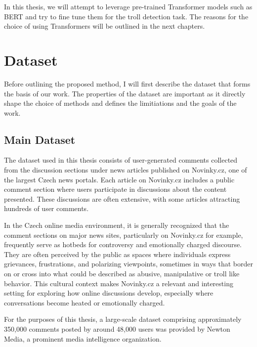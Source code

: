 \documentclass[twoside]{ctuthesis}
\theoremstyle{plain}
\theoremstyle{definition}
\theoremstyle{note}
\begin{document}
In this thesis, we will attempt to leverage pre-trained Transformer models such as BERT and try to fine tune them for the troll detection task. The reasons for the choice of using Transformers will be outlined in the next chapters.\par

\chapter{Dataset}

Before outlining the proposed method, I will first describe the dataset that forms the basis of our work. The properties of the dataset are important as it directly shape the choice of methods and defines the limitiations and the goals of the work. \par

\section{Main Dataset}
The dataset used in this thesis consists of user-generated comments collected from the discussion sections under news articles published on Novinky.cz, one of the largest Czech news portals. Each article on Novinky.cz includes a public comment section where users participate in discussions about the content presented. These discussions are often extensive, with some articles attracting hundreds of user comments.\par

In the Czech online media environment, it is generally recognized that the comment sections on major news sites, particularly on Novinky.cz for example, frequently serve as hotbeds for controversy and emotionally charged discourse. They are often perceived by the public as spaces where individuals express grievances, frustrations, and polarizing viewpoints, sometimes in ways that border on or cross into what could be described as abusive, manipulative or troll like behavior. This cultural context makes Novinky.cz a relevant and interesting setting for exploring how online discussions develop, especially where conversations become heated or emotionally charged.\par

For the purposes of this thesis, a large-scale dataset comprising approximately 350,000 comments posted by around 48,000 users was provided by Newton Media, a prominent media intelligence organization.\par 
\end{document}
